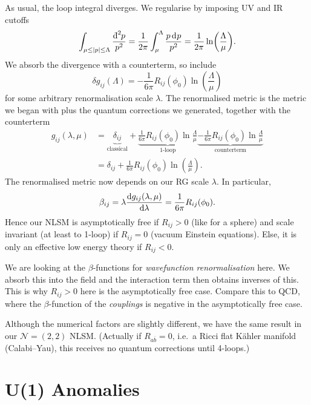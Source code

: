 As usual, the loop integral diverges. We regularise by imposing UV and IR cutoffs
\begin{equation}
  \int_{\mu \leq \abs{p} \leq \Lambda} \frac{\bdd[2]{p}}{p^2} = \frac{1}{2 \pi} \int_{\mu}^{\Lambda} \frac{p \dd[]{p}}{p^2} = \frac{1}{2 \pi}  \ln(\frac{\Lambda}{\mu}).
\end{equation}
We absorb the divergence with a counterterm, so include
\begin{equation}
  \delta g_{ij}(\Lambda) = -\frac{1}{6 \pi} R_{ij}(\phi_0) \ln(\frac{\Lambda}{\mu})
\end{equation}
for some arbitrary renormalisation scale $\lambda$.
The renormalised metric is the metric we began with plus the quantum corrections we generated, together with the counterterm
\begin{align}
  g_{ij}(\lambda, \mu) &= \underbrace{\delta_{ij}}_{\text{classical}} + \underbrace{\frac{1}{6 \pi} R_{ij}(\phi_0) \ln \frac{\Lambda}{\mu}}_{\text{1-loop}} \underbrace{- \frac{1}{6 \pi} R_{ij}(\phi_0) \ln \frac{\Lambda}{\mu}}_{\text{counterterm}} \\
		       &= \delta_{ij} + \frac{1}{6 \pi} R_{ij}(\phi_0) \ln( \frac{\Lambda}{\mu}).
\end{align}
The renormalised metric now depends on our RG scale $\lambda$. In particular, 
\begin{equation}
  \beta_{ij} = \lambda \dv{g_{ij}(\lambda, \mu)}{\lambda} = \frac{1}{6 \pi} R_{ij}(\phi_0).
\end{equation}
Hence our NLSM is asymptotically free if $R_{ij} > 0$ (like for a sphere) and scale invariant (at least to 1-loop) if $R_{ij} = 0$ (vacuum Einstein equations).
Else, it is only an effective low energy theory if $R_{ij} < 0$.
\begin{remark}
  We are looking at the $\beta$-functions for \emph{wavefunction renormalisation} here. We absorb this into the field and the interaction term then obtains inverses of this. This is why $R_{ij} > 0$ here is the asymptotically free case. Compare this to QCD, where the $\beta$-function of the \emph{couplings} is negative in the asymptotically free case.
\end{remark}
Although the numerical factors are slightly different, we have the same result in our $\mathcal{N} = (2,2)$ NLSM.
(Actually if $R_{a \overline{b}{}} = 0$, i.e.~a Ricci flat Kähler manifold (Calabi--Yau), this receives no quantum corrections until 4-loops.)

\section{U(1) Anomalies}%
\label{sec:u_1_anomalies}

